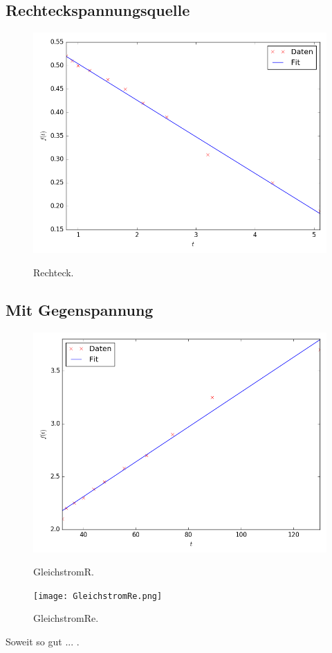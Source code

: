 \subsection{Rechteckspannungsquelle}

\begin{figure}[H]
	\centering
	\caption{Rechteck.}
	\includegraphics[width=\linewidth-150pt,height=\textheight-150pt,keepaspectratio]{Rechteck.png}
	\label{fig:Rechteck}
\end{figure}



\subsection{ Mit Gegenspannung}

\begin{figure}[H]
	\centering
	\caption{GleichstromR.}
	\includegraphics[width=\linewidth-150pt,height=\textheight-150pt,keepaspectratio]{GleichstromR.png}
	\label{fig:GleichstromR}
\end{figure}


\begin{figure}[H]
	\centering
	\caption{GleichstromRe.}
	\texttt{[image: GleichstromRe.png]}
	\label{fig:GleichstromRe}
\end{figure}

Soweit so gut ... .
